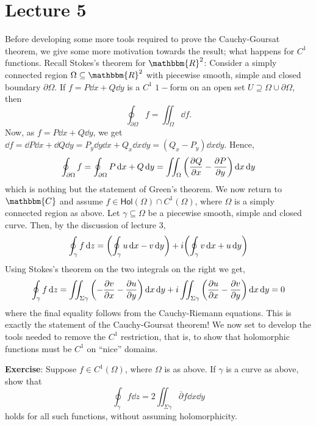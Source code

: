 \documentclass[../ComplexAnalysis_Notes.tex]{subfiles}
\begin{document}
\chapter*{Lecture 5} %
\setcounter{chapter}{5} %
\setcounter{section}{0}
\setcounter{equation}{0}
\setcounter{figure}{0}

Before developing some more tools required to prove the Cauchy-Goursat theorem, we give some more motivation towards the result; what happens for \( C^1 \) functions. Recall Stokes's theorem for \( \mathbbm{R}^2 \): Consider a simply connected region \( \Omega \subseteq \mathbbm{R}^2 \) with piecewise smooth, simple and closed boundary \( \partial \Omega \). If \( f = P \dd{x} + Q \dd{y} \) is a \( C^1 \) \( 1- \)form on an open set \( U \supseteq \Omega \cup \partial \Omega  \), then
\[ 
 \oint_{\partial \Omega} f = \iint_{\Omega}\dd{f}.
 \]
Now, as \( f = P \dd{x} + Q \dd{y} \), we get \( \dd{f} = \dd{P} \dd{x} + \dd{Q} \dd{y} = P_y \dd{y}\dd{x} + Q_x \dd{x}\dd{y} = (Q_x-P_y)\dd{x}\dd{y} \). Hence,
\[ 
  \oint_{\partial \Omega} f = \oint_{\partial \Omega} P \dd{x} + Q \dd{y} = \iint_\Omega \qty(\pdv{Q}{x} - \pdv{P}{y}) \dd{x} \dd{y}
 \]
which is nothing but the statement of Green's theorem. We now return to \( \mathbbm{C} \) and assume \( f \in \textsf{Hol}(\Omega) \cap C^1(\Omega) \), where \( \Omega \) is a simply connected region as above. Let \( \gamma \subseteq \Omega \) be a piecewise smooth, simple and closed curve. Then, by the discussion of lecture 3,
\[ 
 \oint_\gamma f \dd{z} = \qty(\oint_\gamma u \dd{x} - v \dd{y}) + i\qty(\oint_\gamma v \dd{x} + u \dd{y}) 
 \]
 Using Stokes's theorem on the two integrals on the right we get,
 \[ 
  \oint_\gamma f \dd{z} = \iint_{\Sigma \gamma} \qty(-\pdv{v}{x}-\pdv{u}{y})\dd{x}\dd{y} + i \iint_{\Sigma \gamma} \qty(\pdv{u}{x}-\pdv{v}{y})\dd{x}\dd{y} = 0
  \]
  where the final equality follows from the Cauchy-Riemann equations. This is exactly the statement of the Cauchy-Goursat theorem! We now set to develop the tools needed to remove the \( C^1 \) restriction, that is, to show that holomorphic functions must be \( C^1 \) on ``nice'' domains.

\textbf{Exercise}: Suppose \( f \in C^1(\Omega) \), where \( \Omega \) is as above. If \( \gamma \) is a curve as above, show that
\[ 
 \oint_\gamma f \dd{z} = 2 \iint_{\Sigma \gamma} \overline{\partial}f \dd{x}\dd{y}
 \]
holds for all such functions, without assuming holomorphicity.
\medskip
\end{document}
